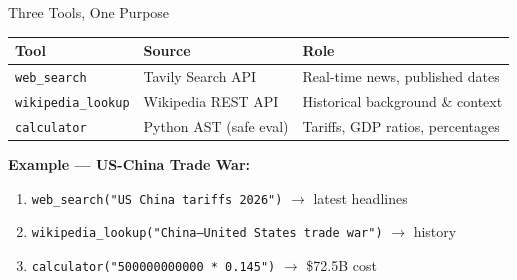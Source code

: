 \documentclass[aspectratio=169]{beamer}
\begin{document}
\begin{frame}{Three Tools, One Purpose}
  \begin{table}
    \begin{tabular}{lll}
      \toprule
      \textbf{Tool} & \textbf{Source} & \textbf{Role} \\
      \midrule
      \texttt{web\_search} & Tavily Search API & Real-time news, published dates \\[4pt]
      \texttt{wikipedia\_lookup} & Wikipedia REST API & Historical background \& context \\[4pt]
      \texttt{calculator} & Python AST (safe eval) & Tariffs, GDP ratios, percentages \\
      \bottomrule
    \end{tabular}
  \end{table}
  \vspace{0.4cm}
  \textbf{Example — US-China Trade War:}
  \begin{enumerate}
      \item \texttt{web\_search("US China tariffs 2026")} $\rightarrow$ latest headlines
    \item \texttt{wikipedia\_lookup("China–United States trade war")} $\rightarrow$ history
    \item \texttt{calculator("500000000000 * 0.145")} $\rightarrow$ \$72.5B cost
  \end{enumerate}
\end{frame}
\end{document}
